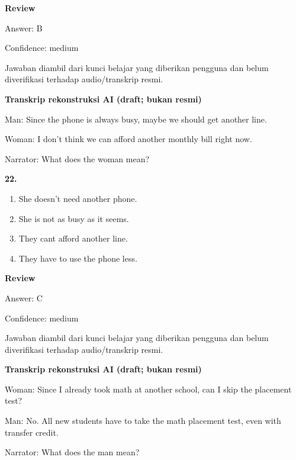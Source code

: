 \documentclass[12pt]{article}
\begin{document}
\par
\begingroup
\setlength{\parskip}{0pt}
\setlength{\parindent}{0pt}
\textbf{Review}\par
Answer: B\par
Confidence: medium\par
Jawaban diambil dari kunci belajar yang diberikan pengguna dan belum diverifikasi terhadap audio/transkrip resmi.\par
\endgroup
\par
\vspace{0.25\baselineskip}
\begin{exampleblock}
\textbf{Transkrip rekonstruksi AI (draft; bukan resmi)}\par
Man: Since the phone is always busy, maybe we should get another line.\par
Woman: I don't think we can afford another monthly bill right now.\par
Narrator: What does the woman mean?\par
\end{exampleblock}
\noindent\textbf{22.}
\begin{enumerate}[label=(\Alph*),leftmargin=*,itemsep=0.2em]
\item She doesn't need another phone.
\item She is not as busy as it seems.
\item They cant afford another line.
\item They have to use the phone less.
\end{enumerate}
\par
\begingroup
\setlength{\parskip}{0pt}
\setlength{\parindent}{0pt}
\textbf{Review}\par
Answer: C\par
Confidence: medium\par
Jawaban diambil dari kunci belajar yang diberikan pengguna dan belum diverifikasi terhadap audio/transkrip resmi.\par
\endgroup
\par
\vspace{0.25\baselineskip}
\begin{exampleblock}
\textbf{Transkrip rekonstruksi AI (draft; bukan resmi)}\par
Woman: Since I already took math at another school, can I skip the placement test?\par
Man: No. All new students have to take the math placement test, even with transfer credit.\par
Narrator: What does the man mean?\par
\end{exampleblock}
\end{document}
